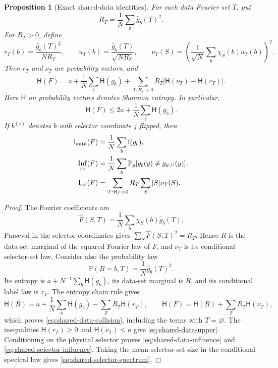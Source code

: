 \documentclass[11pt]{amsart}
\newtheorem{proposition}[theorem]{Proposition}
\theoremstyle{definition}
\theoremstyle{remark}
\renewcommand{\P}{\mathbb P}
\newcommand{\HH}{\mathsf H}
\newcommand{\I}{\mathsf I}
\DeclareMathOperator{\Inf}{Inf}
\newcommand{\wh}[1]{\widehat{#1}}
\begin{document}
\begin{proposition}[Exact shared-data identities]\label{prop:shared-data-collision}
For each data Fourier set $T$, put
\[
 R_T=\frac1N\sum_b\wh g_b(T)^2.
\]
For $R_T>0$, define
\[
 r_T(b)=\frac{\wh g_b(T)^2}{NR_T},\qquad
 u_T(b)=\frac{\wh g_b(T)}{\sqrt{NR_T}},\qquad
 \nu_T(S)=\left(\frac1{\sqrt N}\sum_b\chi_S(b)u_T(b)\right)^2.
\]
Then $r_T$ and $\nu_T$ are probability vectors, and
\begin{equation}\label{eq:shared-data-collision}
 \HH(F)=a+\frac1N\sum_b\HH(g_b)
       +\sum_{T:R_T>0}R_T\bigl[\HH(\nu_T)-\HH(r_T)\bigr].
\end{equation}
Here $\HH$ on probability vectors denotes Shannon entropy. In particular,
\begin{equation}\label{eq:shared-data-upper}
 \HH(F)\le2a+\frac1N\sum_b\HH(g_b).
\end{equation}
If $b^{(j)}$ denotes $b$ with selector coordinate $j$ flipped, then
\begin{align}
 \I_{\rm data}(F)&=\frac1N\sum_b\I(g_b),\label{eq:shared-data-influence}\\
 \Inf_{x_j}(F)&=\frac1N\sum_b\P_y[g_b(y)\ne g_{b^{(j)}}(y)],
       \label{eq:shared-selector-influence}\\
 \I_{\rm sel}(F)&=\sum_{T:R_T>0}R_T\sum_S|S|\nu_T(S).
       \label{eq:shared-selector-spectrum}
\end{align}
\end{proposition}
\begin{proof}
The Fourier coefficients are
\[
 \wh F(S,T)=\frac1N\sum_b\chi_S(b)\wh g_b(T).
\]
Parseval in the selector coordinates gives
$\sum_S\wh F(S,T)^2=R_T$. Hence $R$ is the data-set marginal of the
squared Fourier law of $F$, and $\nu_T$ is its conditional selector-set
law. Consider also the probability law
\[
 \P(B=b,T)=\frac1N\wh g_b(T)^2.
\]
Its entropy is $a+N^{-1}\sum_b\HH(g_b)$, its data-set marginal is $R$,
and its conditional label law is $r_T$. The entropy chain rule gives
\[
 \HH(R)=a+\frac1N\sum_b\HH(g_b)-\sum_T R_T\HH(r_T),
 \qquad
 \HH(F)=\HH(R)+\sum_T R_T\HH(\nu_T),
\]
which proves \eqref{eq:shared-data-collision}, including the terms with
$T=\varnothing$. The inequalities $\HH(r_T)\ge0$ and
$\HH(\nu_T)\le a$ give \eqref{eq:shared-data-upper}.
Conditioning on the physical selector proves
\eqref{eq:shared-data-influence} and \eqref{eq:shared-selector-influence}.
Taking the mean selector-set size in the conditional spectral law gives
\eqref{eq:shared-selector-spectrum}.
\end{proof}
\end{document}

